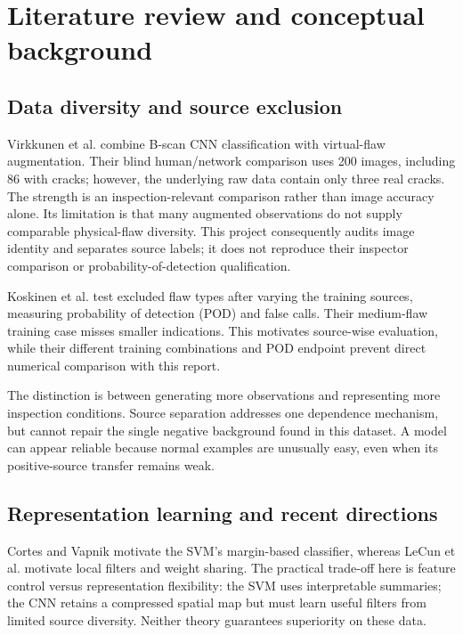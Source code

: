 \documentclass[11pt,a4paper]{article}
\begin{document}
\FloatBarrier
\section{Literature review and conceptual background}

\subsection{Data diversity and source exclusion}

Virkkunen et al. \cite{ref1} combine B-scan CNN classification with virtual-flaw augmentation. Their blind human/network comparison uses 200 images, including 86 with cracks; however, the underlying raw data contain only three real cracks. The strength is an inspection-relevant comparison rather than image accuracy alone. Its limitation is that many augmented observations do not supply comparable physical-flaw diversity. This project consequently audits image identity and separates source labels; it does not reproduce their inspector comparison or probability-of-detection qualification.

Koskinen et al. \cite{ref2} test excluded flaw types after varying the training sources, measuring probability of detection (POD) and false calls. Their medium-flaw training case misses smaller indications. This motivates source-wise evaluation, while their different training combinations and POD endpoint prevent direct numerical comparison with this report.

The distinction is between generating more observations and representing more inspection conditions. Source separation addresses one dependence mechanism, but cannot repair the single negative background found in this dataset. A model can appear reliable because normal examples are unusually easy, even when its positive-source transfer remains weak.

\subsection{Representation learning and recent directions}

Cortes and Vapnik \cite{ref3} motivate the SVM's margin-based classifier, whereas LeCun et al. \cite{ref4} motivate local filters and weight sharing. The practical trade-off here is feature control versus representation flexibility: the SVM uses interpretable summaries; the CNN retains a compressed spatial map but must learn useful filters from limited source diversity. Neither theory guarantees superiority on these data.
\end{document}

